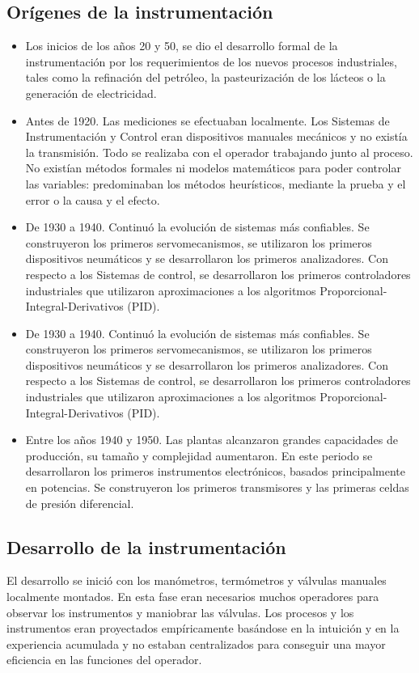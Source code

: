 \documentclass[12pt,letterpaper, onecolumn, titlepage, oneside]{book}
\begin{document}
\subsection{Orígenes de la instrumentación}
\begin{itemize}
    \item Los inicios de los años 20 y 50, se dio el desarrollo formal de la instrumentación por los requerimientos de los nuevos procesos industriales, tales como la refinación del petróleo, la pasteurización de los lácteos o la generación de electricidad.
    \item Antes de 1920. Las mediciones se efectuaban localmente. Los Sistemas de Instrumentación y Control eran dispositivos manuales mecánicos y no existía la transmisión. Todo se realizaba con el operador trabajando junto al proceso. No existían métodos formales ni modelos matemáticos para poder controlar las variables: predominaban los métodos heurísticos, mediante la prueba y el error o la causa y el efecto.
    \item De 1930 a 1940. Continuó la evolución de sistemas más confiables. Se construyeron los primeros servomecanismos, se utilizaron los primeros dispositivos neumáticos y se desarrollaron los primeros analizadores. Con respecto a los Sistemas de control, se desarrollaron los primeros controladores industriales que utilizaron aproximaciones a los algoritmos Proporcional-Integral-Derivativos (PID).
    \item De 1930 a 1940. Continuó la evolución de sistemas más confiables. Se construyeron los primeros servomecanismos, se utilizaron los primeros dispositivos neumáticos y se desarrollaron los primeros analizadores. Con respecto a los Sistemas de control, se desarrollaron los primeros controladores industriales que utilizaron aproximaciones a los algoritmos Proporcional-Integral-Derivativos (PID).
    \item Entre los años 1940 y 1950. Las plantas alcanzaron grandes capacidades de producción, su tamaño y complejidad aumentaron. En este periodo se desarrollaron los primeros instrumentos electrónicos, basados principalmente en potencias. Se construyeron los primeros transmisores y las primeras celdas de presión diferencial.\\
\end{itemize}

\subsection{Desarrollo de la instrumentación}
 El desarrollo se inició con los manómetros, termómetros y válvulas manuales localmente montados. En esta fase eran necesarios muchos operadores para observar los instrumentos y maniobrar las válvulas. Los procesos y los instrumentos eran proyectados empíricamente basándose en la intuición y en la experiencia acumulada y no estaban centralizados para conseguir una mayor eficiencia en las funciones del operador.\\
 
\end{document}
